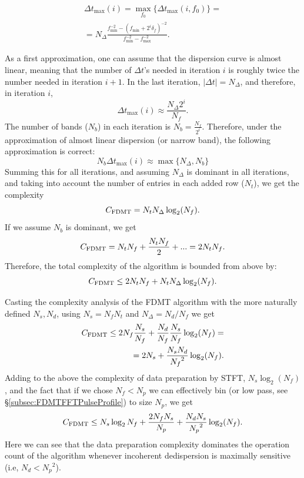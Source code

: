 \documentclass[iop]{emulateapj}
\begin{document}
\begin{align}
\Delta t_{\max}(i) = \max_{f_0}\{\Delta t_{\max}(i,f_0)\} = \\ \nonumber = N_\Delta \frac{f_{\min}^{-2} - (f_{\min} + 2^i\delta_f)^{-2}} {f_{\min}^{-2} - f_{\max}^{-2}}.
\end{align}

As a first approximation, one can assume that the dispersion curve is almost linear, meaning that the number of $\Delta t$'s needed in iteration $i$ is roughly twice the number needed in iteration $i+1$.
In the last iteration, $|\Delta t| = N_\Delta$, and therefore, in iteration $i$, 
\begin{equation}
\Delta t_{\max}(i) \approx \frac{N_\Delta2^i}{N_f}.
\end{equation}
The number of bands ($N_b$) in each iteration is $N_b = \frac{N_f}{2^i}$. Therefore, under the approximation of almost linear dispersion (or narrow band), the following approximation is correct:
\begin{equation}
N_b\Delta t_{\max}(i) \approx \max\{N_\Delta, N_b\}
\end{equation}
Summing this for all iterations, and assuming $N_\Delta$ is dominant in all iterations,  and taking into account the number of entries in each added row ($N_t$), we get the complexity 
\begin{equation}
C_{\rm FDMT} = N_tN_\Delta\log_2(N_f).
\end{equation}
If we assume $N_b$ is dominant, we get \begin{equation}C_{\rm FDMT} = N_tN_f +\frac{N_tN_f}{2} + ... = 2N_tN_f.\end{equation}
Therefore, the total complexity of the algorithm is bounded from above by:
\begin{equation}
C_{\rm FDMT} \leq 2N_tN_f + N_tN_\Delta\log_{2}(N_f).
\end{equation}

Casting the complexity analysis of the FDMT algorithm with the more naturally defined $N_s,N_d$, using $N_s = N_fN_t$ and $N_\Delta = N_d/N_f$ we get \begin{align}C_{\rm FDMT} \leq 2{N_{f}}\frac{{N_{s}}}{{N_{f}}} + \frac{{N_{d}}}{{N_{f}}}  \frac{{N_{s}}}{{N_{f}}}  \log_2({N_{f}}) =\\ \nonumber = 2{N_{s}} + \frac{{N_{s}}{N_{d}}}{{N_{f}}^2}\log_2({N_{f}}).\end{align}
Adding to the above the complexity of data preparation by STFT, ${N_{s}}\log_2({N_{f}})$, and the fact that if we chose ${N_{f}}<{N_{p}}$ we can effectively bin (or low pass, see \S \ref{subsec:FDMTFFTPulseProfile}) to size ${N_{p}}$, we get
\begin{equation}C_{\rm FDMT} \leq {N_{s}}\log_2{{N_{f}}} + \frac{2{N_{f}}{N_{s}}}{{N_{p}}} + \frac{{N_{d}}{N_{s}}}{{N_{p}}^2}\log_2({N_{f}}).\end{equation}
Here we can see that the data preparation complexity dominates the operation count of the algorithm whenever incoherent dedispersion is maximally sensitive (i.e, ${N_{d}} < {N_{p}}^2$).
\end{document}
